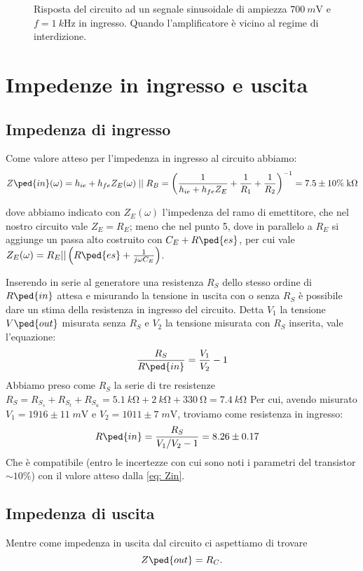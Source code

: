 \documentclass[10pt,a4paper]{article}
\begin{document}
\begin{figure}[htb]
\centering
\caption{Risposta del circuito ad un segnale sinusoidale di ampiezza
$\SI{700}{m\V}$ e $f = \SI{1}{k\Hz}$ in ingresso. Quando l'amplificatore
è vicino al regime di interdizione. \label{fig: Aint}}
\end{figure}

\section{Impedenze in ingresso e uscita}
\subsection{Impedenza di ingresso}
Come valore atteso per l'impedenza in ingresso al circuito abbiamo:
\[
Z\ped{in}(\omega) =
h_{ie} + h_{fe}Z_E(\omega) \; \lvert\rvert \; R_B =
\left(\frac{1}{h_{ie} + h_{fe}Z_E} + \frac{1}{R_1} + \frac{1}{R_2}\right)^{-1}
= 7.5 \pm 10\% \; \si{k\ohm} 
\]

dove abbiamo indicato con $Z_E(\omega)$ l'impedenza del ramo di emettitore,
che nel nostro circuito vale $Z_E = R_E$; meno che nel punto 5, dove in
parallelo a $R_E$ si aggiunge un passa alto costruito con $C_E + R\ped{es}$,
per cui vale $Z_E(\omega) = R_E || \left(R\ped{es} + \frac{1}{j \omega C_E}
\right)$.

Inserendo in serie al generatore una resistenza $R_S$ dello stesso ordine di
$R\ped{in}$ attesa e misurando la tensione in uscita con o senza $R_S$ è
possibile dare un stima della resistenza in ingresso del circuito.
Detta $V_1$ la tensione $V\ped{out}$ misurata senza $R_S$ e $V_2$ la tensione
misurata con $R_S$ inserita, vale l'equazione:
\begin{equation}\label{eq: Zin}
\frac{R_S}{R\ped{in}} = \frac{V_1}{V_2} - 1
\end{equation}
Abbiamo preso come $R_S$ la serie di tre resistenze $R_S =
R_{S_s} + R_{S_t} + R_{S_u} =
\SI{5.1}{k\ohm} + \SI{2}{k\ohm} + \SI{330}{\ohm} =
\SI{7.4}{k\ohm}$
Per cui, avendo misurato $V_1 = 1916 \pm 11 \; \si{m\V}$ e
$V_2 = 1011 \pm 7 \; \si{m\V}$, troviamo come resistenza in ingresso:
\begin{align*}
{R\ped{in}} &= \frac{R_S}{V_1/V_2 - 1} = 8.26 \pm 0.17
\end{align*}
Che è compatibile (entro le incertezze con cui sono noti i parametri del
transistor $\sim 10 \%$) con il valore atteso dalla \eqref{eq: Zin}.
\subsection{Impedenza di uscita}
Mentre come impedenza in uscita dal circuito ci aspettiamo di trovare
\[
Z\ped{out} = R_C
.\]
\end{document}
